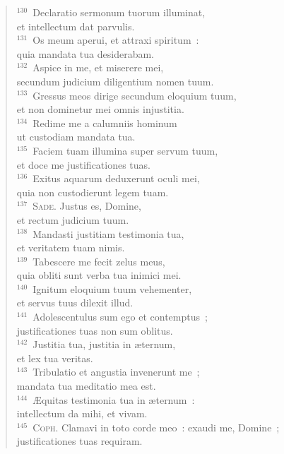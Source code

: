 \begin{verse}
${}^{130}$~Declaratio sermonum tuorum illuminat,\\ et intellectum dat parvulis.\\
${}^{131}$~Os meum aperui, et attraxi spiritum~:\\ quia mandata tua desiderabam.\\
${}^{132}$~Aspice in me, et miserere mei,\\ secundum judicium diligentium nomen tuum.\\
${}^{133}$~Gressus meos dirige secundum eloquium tuum,\\ et non dominetur mei omnis injustitia.\\
${}^{134}$~Redime me a calumniis hominum\\ ut custodiam mandata tua.\\
${}^{135}$~Faciem tuam illumina super servum tuum,\\ et doce me justificationes tuas.\\
${}^{136}$~Exitus aquarum deduxerunt oculi mei,\\ quia non custodierunt legem tuam.\\
${}^{137}$~\textsc{Sade.} Justus es, Domine,\\ et rectum judicium tuum.\\
${}^{138}$~Mandasti justitiam testimonia tua,\\ et veritatem tuam nimis.\\
${}^{139}$~Tabescere me fecit zelus meus,\\ quia obliti sunt verba tua inimici mei.\\
${}^{140}$~Ignitum eloquium tuum vehementer,\\ et servus tuus dilexit illud.\\
${}^{141}$~Adolescentulus sum ego et contemptus~;\\ justificationes tuas non sum oblitus.\\
${}^{142}$~Justitia tua, justitia in \ae ternum,\\ et lex tua veritas.\\
${}^{143}$~Tribulatio et angustia invenerunt me~;\\ mandata tua meditatio mea est.\\
${}^{144}$~\AE quitas testimonia tua in \ae ternum~:\\ intellectum da mihi, et vivam.\\
${}^{145}$~\textsc{Coph.} Clamavi in toto corde meo~: exaudi me, Domine~;\\ justificationes tuas requiram.\\

\end{verse}
